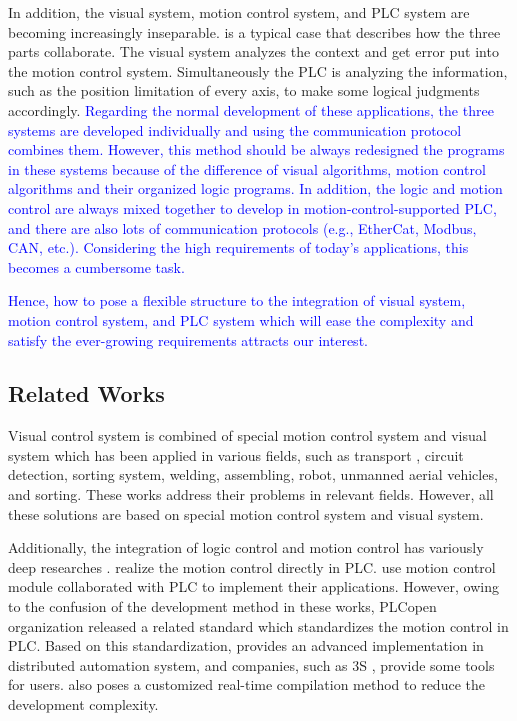 \documentclass[journal,UTF8]{IEEEtran}
\begin{document}
In addition, the visual system, motion control system, and PLC system are becoming increasingly inseparable. \cite{Chen2014A} is a typical case that describes how the three parts collaborate. The visual system analyzes the context and get error put into the motion control system. Simultaneously the PLC is analyzing the information, such as the position limitation of every axis, to make some logical judgments accordingly. \textcolor{blue}{Regarding the normal development of these applications, the three systems are developed individually and using the communication protocol combines them. However, this method should be always redesigned the programs in these systems because of the difference of visual algorithms, motion control algorithms and their organized logic programs. In addition, the logic and motion control are always mixed together to develop in motion-control-supported PLC, and there are also lots of communication protocols (e.g., EtherCat, Modbus, CAN, etc.). Considering the high requirements of today’s applications, this becomes a cumbersome task.}

\textcolor{blue}{Hence, how to pose a flexible structure to the integration of visual system, motion control system, and PLC system which will ease the complexity and satisfy the ever-growing requirements attracts our interest.}

\subsection{Related Works}

Visual control system is combined of special motion control system and visual system which has been applied in various fields, such as transport \cite{Xing2014Intersection}, circuit detection\cite{Nian2005An}, sorting system, welding\cite{Chen2014A}, assembling\cite{Wang2008Visual,Xiao2014Visual}, robot\cite{Wu2013Cloud,Tsai2017A}, unmanned aerial vehicles\cite{Guenard2010A,Serra2016Landing}, and sorting\cite{Sun2013Automatic}. These works address their problems in relevant fields. However, all these solutions are based on special motion control system and visual system.

Additionally, the integration of logic control and motion control has variously deep researches \cite{Ioannides2004Design,Shi2016The,Fang2017Design, syaichu2011model}. \cite{Ioannides2004Design,syaichu2011model} realize the motion control directly in PLC. \cite{Peng2011Linear, Qian2014A, OMRON2006CS1W} use motion control module collaborated with PLC to implement their applications. However, owing to the confusion of the development method in these works, PLCopen organization released a related standard \cite{PLCopen2005Function} which standardizes the motion control in PLC. Based on this standardization, \cite{S2006Advanced} provides an advanced implementation in distributed automation system, and companies, such as 3S \cite{3S2017Logic}, provide some tools for users. \cite{wu2018customized} also poses a customized real-time compilation method to reduce the development complexity.
\end{document}
